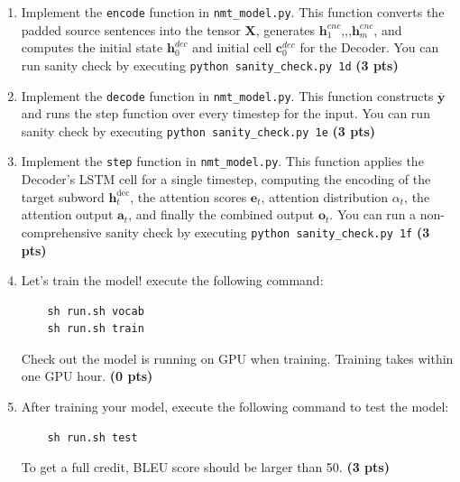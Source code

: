 \documentclass{assignment format}
\newcommand{\hdec}{\mathbf{h}^{\text{dec}}}
\begin{document}
\begin{enumerate}[label=(\alph*)]
    \item Implement the \texttt{encode} function in \texttt{nmt\_model.py}. This function converts the padded source sentences into the tensor $\mathbf{X}$, generates $\mathbf{h}^{enc}_1$,,,$\mathbf{h}^{enc}_m$, and computes the initial state $\mathbf{h}^{dec}_0$ and initial cell $\mathbf{c}^{dec}_0$ for the Decoder. You can run sanity check by executing \texttt{python sanity\_check.py 1d} \textbf{(3 pts)}
    \item Implement the \texttt{decode} function in \texttt{nmt\_model.py}. This function constructs $\overline{\mathbf{y}}$ 
    and runs the step function over every timestep for the input. You can run sanity check by executing \texttt{python sanity\_check.py 1e} \textbf{(3 pts)}
    \item Implement the \texttt{step} function in \texttt{nmt\_model.py}. This function applies the Decoder's LSTM cell for a single timestep, computing the encoding of the target subword $\hdec_t$, the attention scores $\mathbf{e}_t$, attention distribution $\alpha_t$, the attention output $\mathbf{a}_{t}$, and finally the combined output $\mathbf{o}_t$. You can run a non-comprehensive sanity check by executing \texttt{python sanity\_check.py 1f}  \textbf{(3 pts)}
\item Let's train the model! execute the following command:
\begin{verbatim}
    sh run.sh vocab
    sh run.sh train
\end{verbatim}
Check out the model is running on GPU when training. Training takes within one GPU hour. \textbf{(0 pts)}
    \item After training your model, execute the following command to test the model:
\begin{verbatim}
    sh run.sh test
\end{verbatim}
    To get a full credit, BLEU score should be larger than 50. \textbf{(3 pts)}
    
\end{enumerate}
\end{document}
